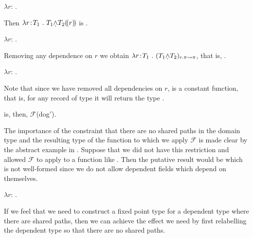 \begin{shaded}
\begin{ex}
$\lambda r$: .  
\end{ex}
Then $\lambda r\!:\!T_1\ .\ T_1\text{\d{$\wedge$}}T_2\dep{r}$ is
\nexteg{}.
\begin{ex} 
  $\lambda r$: .  
\end{ex} 
Removing any dependence on $r$ we obtain $\lambda r\!:\!T_1\ .\
(T_1\text{\d{$\wedge$}}T_2)_{r.\pi\leadsto\pi}$, that is, \nexteg{}.
\begin{ex} 
 $\lambda r$: . 
\end{ex} 
Note that since we have removed all dependencies on $r$, \preveg{} is
a constant function, that is, for any record of type
 it will return the type
\nexteg{}.
\begin{ex} 
\end{ex} 
\preveg{} is, then, $\mathcal{F}$(dog$'$).  
  

The importance of the constraint that there are no shared paths in the
domain type and the resulting type of the function to which we apply
$\mathcal{F}$ is made clear by the abstract example in \nexteg{}.
Suppose that we did not have this restriction and allowed
$\mathcal{F}$ to apply to a function like .  Then the putative result
would be \nexteg{b} which is not well-formed since we do not allow
dependent fields which depend on themselves.
\begin{ex} 
\begin{subex} 
 
\item $\lambda r$: .  
 
\item {} 
 
\end{subex} 
   
\end{ex} 

If we feel that we need to construct a fixed point type for a
dependent type where there are shared paths, then we can achieve the
effect we need by first relabelling the dependent type so that there
are no shared paths.


\end{shaded}
